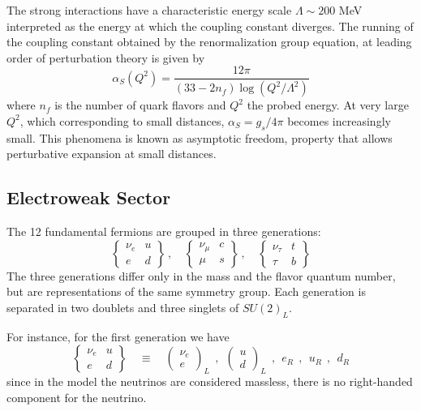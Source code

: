 The strong interactions have a characteristic energy scale $\Lambda\sim 200$ MeV interpreted as the energy at which the coupling constant diverges. The running of the coupling constant obtained by the renormalization group equation, at leading order of perturbation theory is given by
\begin{equation}
\alpha_S(Q^2) = \frac{12\pi}{(33-2n_f)\log(Q^2/\Lambda^2)}
\end{equation}
where $n_f$ is the number of quark flavors and $Q^2$ the probed energy. At very large $Q^2$, which corresponding to small distances, $\alpha_S = g_s/4\pi$ becomes increasingly small. This phenomena is known as asymptotic freedom, property that allows perturbative expansion at small distances.

\subsection{Electroweak Sector}
The 12 fundamental fermions are grouped in three generations:
\begin{equation*}
\left\lbrace
\begin{array}{cc}
\nu_e & u \\
e     & d
\end{array}
\right\rbrace \,,\quad
\left\lbrace
\begin{array}{cc}
\nu_\mu & c \\
\mu     & s
\end{array}
\right\rbrace \,,\quad
\left\lbrace
\begin{array}{cc}
\nu_\tau & t \\
\tau     & b
\end{array}
\right\rbrace
\end{equation*}
The three generations differ only in the mass and the flavor quantum number, but are representations of the same symmetry group. Each generation is separated in two doublets and three singlets of $SU(2)_L$. 

For instance, for the first generation we have
\begin{equation*}
\left\lbrace
\begin{array}{cc}
\nu_e & u \\
e     & d
\end{array}
\right\rbrace \quad \equiv \quad
\left(\begin{array}{c}
\nu_e \\ e    
\end{array}\right)_{L} \:\:,\:\:
\left(\begin{array}{c}
u \\ d    
\end{array}\right)_{L} \:\:,\:\:
e_{R}\:\:,\:\:u_R\:\:,\:\:d_{R}
\end{equation*}
since in the model the neutrinos are considered massless, there is no right-handed component for the neutrino.

